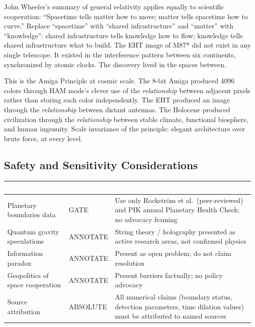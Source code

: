 \documentclass[11pt,letterpaper]{article}
\newcommand{\tableheader}[1]{\textbf{\sffamily\textcolor{white}{#1}}}
\begin{document}
John Wheeler's summary of general relativity applies equally to scientific cooperation: ``Spacetime tells matter how to move; matter tells spacetime how to curve.'' Replace ``spacetime'' with ``shared infrastructure'' and ``matter'' with ``knowledge'': shared infrastructure tells knowledge how to flow; knowledge tells shared infrastructure what to build. The EHT image of M87* did not exist in any single telescope. It existed in the interference pattern between six continents, synchronized by atomic clocks. The discovery lived in the spaces between.

This is the Amiga Principle at cosmic scale. The 8-bit Amiga produced 4096 colors through HAM mode's clever use of the \textit{relationship} between adjacent pixels rather than storing each color independently. The EHT produced an image through the \textit{relationship} between distant antennas. The Holocene produced civilization through the \textit{relationship} between stable climate, functional biosphere, and human ingenuity. Scale invariance of the principle: elegant architecture over brute force, at every level.

\subsection{Safety and Sensitivity Considerations}

\begin{center}
\begin{tabularx}{\textwidth}{L{3.5cm}L{2cm}X}
\toprule
{}
\tableheader{Area} & \tableheader{Type} & \tableheader{Guidance} \\
\midrule
Planetary boundaries data & GATE & Use only Rockstr{\"o}m et al.\ (peer-reviewed) and PIK annual Planetary Health Check; no advocacy framing \\
Quantum gravity speculations & ANNOTATE & String theory / holography presented as active research areas, not confirmed physics \\
Information paradox & ANNOTATE & Present as open problem; do not claim resolution \\
Geopolitics of space cooperation & ANNOTATE & Present barriers factually; no policy advocacy \\
Source attribution & ABSOLUTE & All numerical claims (boundary status, detection parameters, time dilation values) must be attributed to named sources \\
\bottomrule
\end{tabularx}
\end{center}
\end{document}
